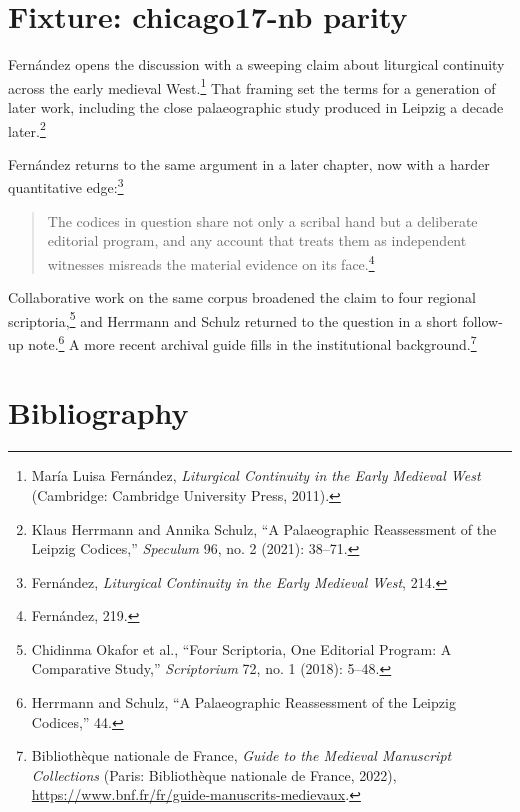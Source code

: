 

\hypertarget{fixture-chicago17-nb-parity}{%
\section{Fixture: chicago17-nb
parity}\label{fixture-chicago17-nb-parity}}

Fernández opens the discussion with a sweeping claim about liturgical
continuity across the early medieval West.\footnote{María Luisa
  Fernández, \emph{Liturgical Continuity in the Early Medieval West}
  (Cambridge: Cambridge University Press, 2011).} That framing set the
terms for a generation of later work, including the close palaeographic
study produced in Leipzig a decade later.\footnote{Klaus Herrmann and
  Annika Schulz, {``A Palaeographic Reassessment of the Leipzig
  Codices,''} \emph{Speculum} 96, no. 2 (2021): 38--71.}

Fernández returns to the same argument in a later chapter, now with a
harder quantitative edge:\footnote{Fernández, \emph{Liturgical
  Continuity in the Early Medieval West}, 214.}

\begin{quote}
The codices in question share not only a scribal hand but a deliberate
editorial program, and any account that treats them as independent
witnesses misreads the material evidence on its face.\footnote{Fernández,
  219.}
\end{quote}

Collaborative work on the same corpus broadened the claim to four
regional scriptoria,\footnote{Chidinma Okafor et al., {``Four
  Scriptoria, One Editorial Program: A Comparative Study,''}
  \emph{Scriptorium} 72, no. 1 (2018): 5--48.} and Herrmann and Schulz
returned to the question in a short follow-up note.\footnote{Herrmann
  and Schulz, {``A Palaeographic Reassessment of the Leipzig Codices,''}
  44.} A more recent archival guide fills in the institutional
background.\footnote{Bibliothèque nationale de France, \emph{Guide to
  the Medieval Manuscript Collections} (Paris: Bibliothèque nationale de
  France, 2022), \url{https://www.bnf.fr/fr/guide-manuscrits-medievaux}.}

\hypertarget{bibliography}{%
\section*{Bibliography}\label{bibliography}}


